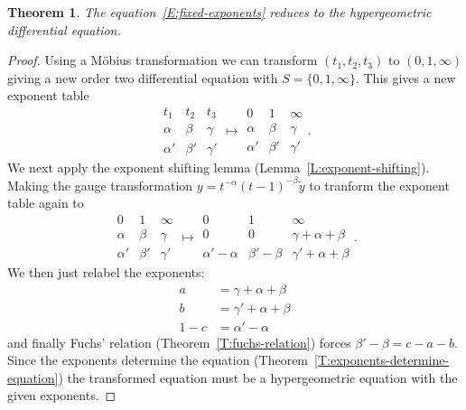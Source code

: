 \documentclass[12pt]{book}
\numberwithin{equation}{section}
\newtheorem{theorem}{Theorem}[subsection]
\theoremstyle{definition}
\theoremstyle{remark}
\begin{document}
\begin{theorem}
	The equation~\ref{E:fixed-exponents} reduces to the hypergeometric differential equation.
\end{theorem}
\begin{proof}
Using a M\"obius transformation we can transform $(t_1,t_2,t_3)$ to $(0,1,\infty)$ giving a new order two differential equation with $S = \lbrace 0,1,\infty\rbrace$.
This gives a new exponent table
	$$\begin{array}{ccc}
	t_1 & t_2 & t_3 \\
	\hline \hline \alpha & \beta & \gamma \\
	\alpha' & \beta' & \gamma' 
	\end{array} \mapsto \begin{array}{ccc}
		0& 1 & \infty \\
		\hline \hline \alpha & \beta & \gamma \\
		\alpha' & \beta' & \gamma' 
	\end{array}.$$
We next apply the exponent shifting lemma (Lemma~\ref{L:exponent-shifting}).
Making the gauge transformation $y = t^{-\alpha}(t-1)^{-\beta}\widetilde{y}$ to tranform the exponent table again to
 	$$\begin{array}{ccc}
 	0& 1 & \infty \\
 	\hline \hline \alpha & \beta & \gamma \\
 	\alpha' & \beta' & \gamma' 
 	\end{array} \mapsto \begin{array}{ccc}
 0& 1 & \infty \\
 \hline \hline 0& 0 & \gamma +\alpha +\beta \\
 \alpha' -\alpha& \beta'-\beta & \gamma' +\alpha+\beta
 \end{array}.$$
 We then just relabel the exponents:
   \begin{align*}
   a &= \gamma +\alpha +\beta\\
   b &= \gamma' +\alpha+\beta\\
   1-c &= \alpha' -\alpha 
   \end{align*}
  and finally Fuchs' relation (Theorem~\ref{T:fuchs-relation}) forces $\beta'-\beta=c-a-b$.
  Since the exponents determine the equation (Theorem~\ref{T:exponents-determine-equation}) the transformed equation must be a hypergeometric equation with the given exponents. 
\end{proof}

\end{document}
